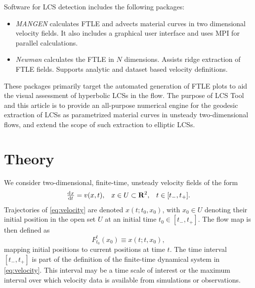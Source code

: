 \documentclass{elsarticle}
\begin{document}
Software for LCS detection includes the following packages:
\begin{itemize}
\item \emph{MANGEN}\citep{lekien03:_time} calculates FTLE and advects material curves in two dimensional velocity fields. It also includes a graphical user interface and uses MPI for parallel calculations.
\item \emph{Newman}\citep{toit10:_trans} calculates the FTLE in $N$ dimensions. Assists ridge extraction of FTLE fields. Supports analytic  and dataset based velocity definitions.
\end{itemize}
These packages primarily target the automated generation of FTLE plots to aid the visual assessment of hyperbolic LCSs in the flow. The purpose of LCS Tool and this article is to provide an all-purpose numerical engine for the geodesic extraction of LCSs as parametrized material curves in unsteady two-dimensional flows, and extend the scope of such extraction to elliptic LCSs.

\section{Theory}

We consider two-dimensional, finite-time, unsteady velocity fields of the form
\begin{align}
\od{x}{t} = v(x,t), && x \in U \subset \mathbf R^2, && t \in [t_-,t_+].
\label{eq:velocity}
\end{align}
Trajectories of \cref{eq:velocity} are denoted $x(t;t_0,x_0)$, with $x_0 \in U$ denoting their initial position in the open set $U$ at an initial time $t_0 \in [t_-,t_+]$. The flow map is then defined as
\[
F_{t_0}^t(x_0) \equiv x(t;t,x_0),
\]
mapping initial positions to current positions at time $t$. The time interval $[t_-,t_+]$ is part of the definition of the finite-time dynamical system in \cref{eq:velocity}. This interval may be a time scale of interest or the maximum interval over which velocity data is available from simulations or observations.
\end{document}
